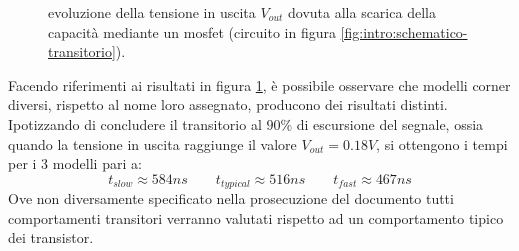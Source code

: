 		\begin{figure}[bht]
			\centering
			
			\caption{evoluzione della tensione in uscita $V_{out}$ dovuta alla scarica della capacità mediante un mosfet (circuito in figura \ref{fig:intro:schematico-transitorio}).}
			\label{fig:intro:nmos-tempitransitorio}
		\end{figure}
	
		Facendo riferimenti ai risultati in figura \ref{fig:intro:nmos-tempitransitorio}, è possibile osservare che modelli corner diversi, rispetto al nome loro assegnato, producono dei risultati distinti. Ipotizzando di concludere il transitorio al $90\%$ di escursione del segnale, ossia quando la tensione in uscita raggiunge il valore $V_{out} = 0.18V$, si ottengono i tempi per i 3 modelli pari a:
		\[ t_{slow} \approx 584 ns \qquad t_{typical} \approx 516 ns \qquad t_{fast} \approx 467ns    \] 
		Ove non diversamente specificato nella prosecuzione del documento tutti comportamenti transitori verranno valutati rispetto ad un comportamento tipico dei transistor.
		
	
	
	
	
	
	
	
	
	
	
	